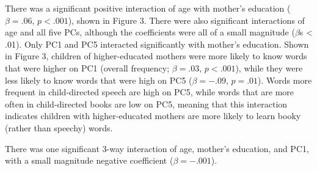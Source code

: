 \documentclass[10pt, letterpaper]{article}
\begin{document}
There was a significant positive interaction of age with mother's
education (\(\beta=.06\), \(p<.001\)), shown in Figure 3. There were
also significant interactions of age and all five PCs, although the
coefficients were all of a small magnitude (\(\beta\)s \textless{} .01).
Only PC1 and PC5 interacted significantly with mother's education. Shown
in Figure 3, children of higher-educated mothers were more likely to
know words that were higher on PC1 (overall frequency; \(\beta = .03\),
\(p<.001\)), while they were less likely to know words that were high on
PC5 (\(\beta = -.09\), \(p=.01\)). Words more frequent in child-directed
speech are high on PC5, while words that are more often in
child-directed books are low on PC5, meaning that this interaction
indicates children with higher-educated mothers are more likely to learn
booky (rather than speechy) words.

There was one significant 3-way interaction of age, mother's education,
and PC1, with a small magnitude negative coefficient (\(\beta=-.001\)).
\end{document}
